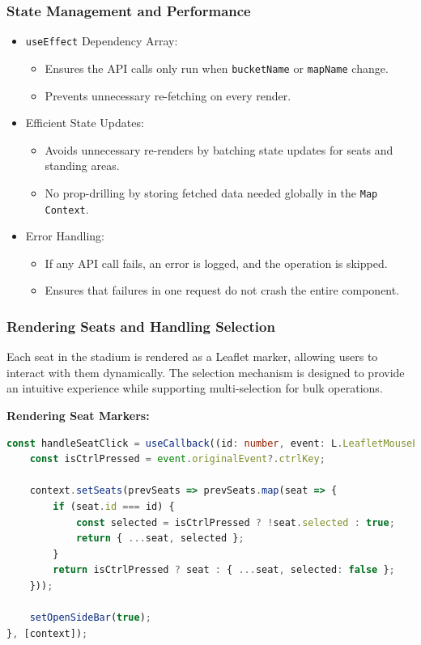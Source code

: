 \subsubsection{State Management and Performance}
\begin{itemize}
    \item \texttt{useEffect} Dependency Array:
    \begin{itemize}
        \item Ensures the API calls only run when \texttt{bucketName} or \texttt{mapName} change.
        \item Prevents unnecessary re-fetching on every render.
    \end{itemize}
    
    \item Efficient State Updates:
    \begin{itemize}
        \item Avoids unnecessary re-renders by batching state updates for seats and standing areas.
        \item No prop-drilling by storing fetched data needed globally in the \texttt{Map Context}.
    \end{itemize}

    \item Error Handling:
    \begin{itemize}
        \item If any API call fails, an error is logged, and the operation is skipped.
        \item Ensures that failures in one request do not crash the entire component.
    \end{itemize}
\end{itemize}

\subsubsection{Rendering Seats and Handling Selection}

Each seat in the stadium is rendered as a Leaflet marker, allowing users to interact with them dynamically. The selection mechanism is designed to provide an intuitive experience while supporting multi-selection for bulk operations.

\textbf{Rendering Seat Markers:}
\begin{lstlisting}[language=TypeScript, caption=Rendering and Selecting Seats, label=lst:seat-rendering]
const handleSeatClick = useCallback((id: number, event: L.LeafletMouseEvent) => {
    const isCtrlPressed = event.originalEvent?.ctrlKey;

    context.setSeats(prevSeats => prevSeats.map(seat => {
        if (seat.id === id) {
            const selected = isCtrlPressed ? !seat.selected : true;
            return { ...seat, selected };
        }
        return isCtrlPressed ? seat : { ...seat, selected: false };
    }));

    setOpenSideBar(true);
}, [context]);
\end{lstlisting}

